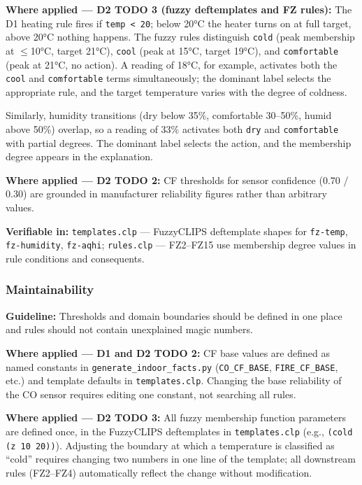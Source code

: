 \documentclass{article}
\begin{document}
\textbf{Where applied — D2 TODO 3 (fuzzy deftemplates and FZ rules):} The D1 heating rule fires if \texttt{temp < 20}; below 20°C the heater turns on at full target, above 20°C nothing happens. The fuzzy rules distinguish \texttt{cold} (peak membership at $\leq$10°C, target 21°C), \texttt{cool} (peak at 15°C, target 19°C), and \texttt{comfortable} (peak at 21°C, no action). A reading of 18°C, for example, activates both the \texttt{cool} and \texttt{comfortable} terms simultaneously; the dominant label selects the appropriate rule, and the target temperature varies with the degree of coldness.

Similarly, humidity transitions (dry below 35\%, comfortable 30–50\%, humid above 50\%) overlap, so a reading of 33\% activates both \texttt{dry} and \texttt{comfortable} with partial degrees. The dominant label selects the action, and the membership degree appears in the explanation.

\textbf{Where applied — D2 TODO 2:} CF thresholds for sensor confidence (0.70 / 0.30) are grounded in manufacturer reliability figures rather than arbitrary values.

\textbf{Verifiable in:} \texttt{templates.clp} — FuzzyCLIPS deftemplate shapes for \texttt{fz-temp}, \texttt{fz-humidity}, \texttt{fz-aqhi}; \texttt{rules.clp} — FZ2–FZ15 use membership degree values in rule conditions and consequents.

\subsubsection{Maintainability}

\textbf{Guideline:} Thresholds and domain boundaries should be defined in one place and rules should not contain unexplained magic numbers.

\textbf{Where applied — D1 and D2 TODO 2:} CF base values are defined as named constants in \texttt{generate\_indoor\_facts.py} (\texttt{CO\_CF\_BASE}, \texttt{FIRE\_CF\_BASE}, etc.) and template defaults in \texttt{templates.clp}. Changing the base reliability of the CO sensor requires editing one constant, not searching all rules.

\textbf{Where applied — D2 TODO 3:} All fuzzy membership function parameters are defined once, in the FuzzyCLIPS deftemplates in \texttt{templates.clp} (e.g., \texttt{(cold (z 10 20))}). Adjusting the boundary at which a temperature is classified as ``cold'' requires changing two numbers in one line of the template; all downstream rules (FZ2–FZ4) automatically reflect the change without modification.
\end{document}
